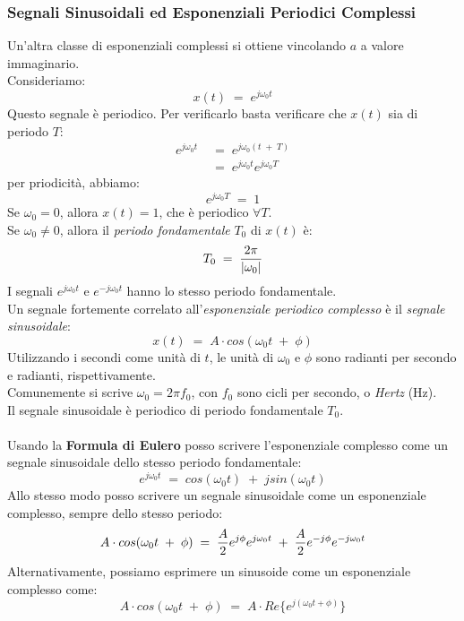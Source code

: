 \documentclass{article}
\begin{document}
			\subsubsection{Segnali Sinusoidali ed Esponenziali Periodici Complessi}
				Un'altra classe di esponenziali complessi si ottiene vincolando $ a $ a valore immaginario. \\
				Consideriamo:
				\[
					x(t)\; =\; e^{j\omega_{0}t}
				\]
				Questo segnale è periodico. Per verificarlo basta verificare che $ x(t) $ sia di periodo $ T $:
				\[
					\begin{aligned}
						e^{j\omega_{0}t}\; &=\; e^{j\omega_{0}(t\; +\; T)} \\
										   &=\; e^{j\omega_{0}t}e^{j\omega_{0}T}
					\end{aligned}
				\]
				per priodicità, abbiamo:
				\[
					e^{j\omega_{0}T}\; =\; 1
				\]
				Se $ \omega_0 = 0 $, allora $ x(t) = 1 $, che è periodico $ \forall T $. \\
				Se $ \omega_0 \neq 0 $, allora il \textit{periodo fondamentale} $ T_0 $ di $ x(t) $ è:
				\[
					T_0\; =\; {{2\pi}\over{\left|\omega_0\right|}}
				\]
				I segnali $ e^{j\omega_{0}t} $ e $ e^{-j\omega_{0}t} $ hanno lo stesso periodo fondamentale. \\
				Un segnale fortemente correlato all'\textit{esponenziale periodico complesso} è il \textit{segnale sinusoidale}:
				\[
					x(t)\; =\; A\cdot cos(\omega_0t\; +\; \phi)
				\]
				Utilizzando i secondi come unità di $ t $, le unità di $ \omega_0 $ e $ \phi $ sono radianti per secondo e radianti, rispettivamente. \\
				Comunemente si scrive $ \omega_0 = 2\pi f_0 $, con $ f_0 $ sono cicli per secondo, o \textit{Hertz} (Hz). \\
				Il segnale sinusoidale è periodico di periodo fondamentale $ T_0 $. \\
				\\
				Usando la \textbf{Formula di Eulero} posso scrivere l'esponenziale complesso come un segnale sinusoidale dello stesso periodo fondamentale:
				\[
					e^{j\omega_{0}t}\; =\; cos(\omega_0t)\; +\; jsin(\omega_0t)
				\]
				Allo stesso modo posso scrivere un segnale sinusoidale come un esponenziale complesso, sempre dello stesso periodo:
				\[
					A\cdot cos(\omega_0t\; +\; \phi)\; =\; {A\over 2}e^{j\phi}e^{j\omega_{0}t}\; +\; {A\over 2}e^{-j\phi}e^{-j\omega_{0}t}
				\]
				Alternativamente, possiamo esprimere un sinusoide come un esponenziale complesso come:
				\[
					A\cdot cos(\omega_0t\; +\; \phi)\; =\; A\cdot Re\{e^{j(\omega_0t+\phi)}\}
				\]
\end{document}
